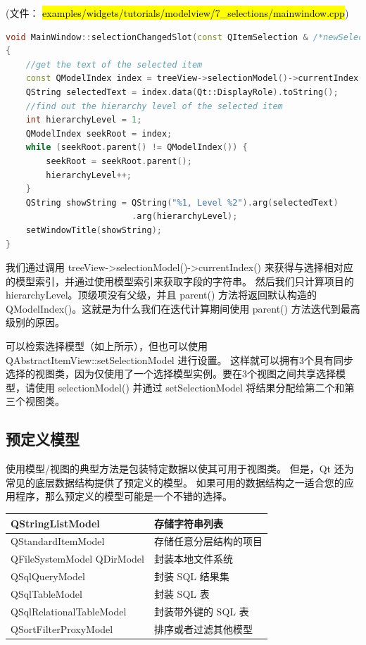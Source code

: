 (文件： \hl{examples/widgets/tutorials/modelview/7\_selections/mainwindow.cpp})

\begin{lstlisting}[language=C++]
void MainWindow::selectionChangedSlot(const QItemSelection & /*newSelection*/, const QItemSelection & /*oldSelection*/)
{
    //get the text of the selected item
    const QModelIndex index = treeView->selectionModel()->currentIndex();
    QString selectedText = index.data(Qt::DisplayRole).toString();
    //find out the hierarchy level of the selected item
    int hierarchyLevel = 1;
    QModelIndex seekRoot = index;
    while (seekRoot.parent() != QModelIndex()) {
        seekRoot = seekRoot.parent();
        hierarchyLevel++;
    }
    QString showString = QString("%1, Level %2").arg(selectedText)
                         .arg(hierarchyLevel);
    setWindowTitle(showString);
}
\end{lstlisting}

我们通过调用 treeView->selectionModel()->currentIndex() 来获得与选择相对应的模型索引，并通过使用模型索引来获取字段的字符串。
然后我们只计算项目的hierarchyLevel。顶级项没有父级，并且 parent() 方法将返回默认构造的 QModelIndex()。这就是为什么我们在迭代计算期间使用 parent() 方法迭代到最高级别的原因。

可以检索选择模型（如上所示），但也可以使用 QAbstractItemView::setSelectionModel 进行设置。
这样就可以拥有3个具有同步选择的视图类，因为仅使用了一个选择模型实例。要在3个视图之间共享选择模型，请使用 selectionModel() 并通过 setSelectionModel 将结果分配给第二个和第三个视图类。

\subsection{预定义模型}

使用模型/视图的典型方法是包装特定数据以使其可用于视图类。
但是，Qt 还为常见的底层数据结构提供了预定义的模型。
如果可用的数据结构之一适合您的应用程序，那么预定义的模型可能是一个不错的选择。

\begin{longtable}[l]{|l|l|}
\hline
QStringListModel &	存储字符串列表 \\ 
\hline
QStandardItemModel &	存储任意分层结构的项目\\
\hline
QFileSystemModel
QDirModel	 & 封装本地文件系统\\ 
\hline
QSqlQueryModel &	封装 SQL 结果集\\
\hline
QSqlTableModel	& 封装 SQL 表\\
\hline
QSqlRelationalTableModel &	封装带外键的 SQL 表 \\
\hline
QSortFilterProxyModel	& 排序或者过滤其他模型 \\
\hline
\end{longtable}

